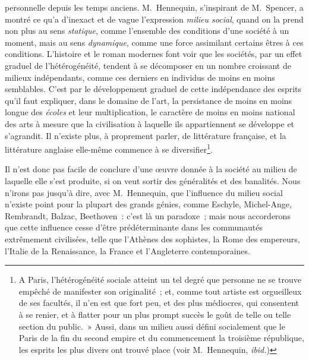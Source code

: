 \documentclass[french,twoside]{book} %
\begin{document}
personnelle depuis les temps anciens. M. Hennequin, s’inspirant de M. Spencer, a montré ce qu’a d’inexact et de vague l’expression \emph{milieu social}, quand on la prend non plus au sens \emph{statique}, comme l’ensemble des conditions d’une société à un moment, mais au sens \emph{dynamique}, comme une force assimilant certains êtres à ces conditions. L’histoire et le roman modernes font voir que les sociétés, par un effet graduel de l’hétérogénéité, tendent à se décomposer en un nombre croissant de milieux indépendants, comme ces derniers en individus de moins en moins semblables. C’est par le développement graduel de cette indépendance des esprits qu’il faut expliquer, dans le domaine de l’art, la persistance de moins en moins longue des \emph{écoles} et leur multiplication, le caractère de moins en moins national des arts à mesure que la civilisation à laquelle ils appartiennent se développe et s’agrandit. Il n’existe plus, à proprement parler, de littérature française, et la littérature anglaise elle-même commence à se diversifier\footnote{ A Paris, l’hétérogénéité sociale atteint un tel degré que personne ne se trouve empêché de manifester son originalité ; et, comme tout artiste est orgueilleux de ses facultés, il n’en est que fort peu, et des plus médiocres, qui consentent à se renier, et à flatter pour un plus prompt succès le goût de telle ou telle section du public. » Aussi, dans un milieu aussi défini socialement que le Paris de la fin du second empire et du commencement la troisième république, les esprits les plus divers ont trouvé place (voir M. Hennequin, \emph{ibid.})}.\par
Il n’est donc pas facile de conclure d’une œuvre donnée à la société au milieu de laquelle elle s’est produite, si on veut sortir des généralités et des banalités. Nous n’irons pas jusqu’à dire, avec M. Hennequin, que l’influence du milieu social n’existe point pour la plupart des grands génies, comme Eschyle, Michel-Ange, Rembrandt, Balzac, Beethoven : c’est là un paradoxe ; mais nous accorderons que cette influence cesse d’être prédéterminante dans les communautés extrêmement civilisées, telle que l’Athènes des sophistes, la Rome des empereurs, l’Italie de la Renaissance, la France et l’Angleterre contemporaines.\par
\end{document}
